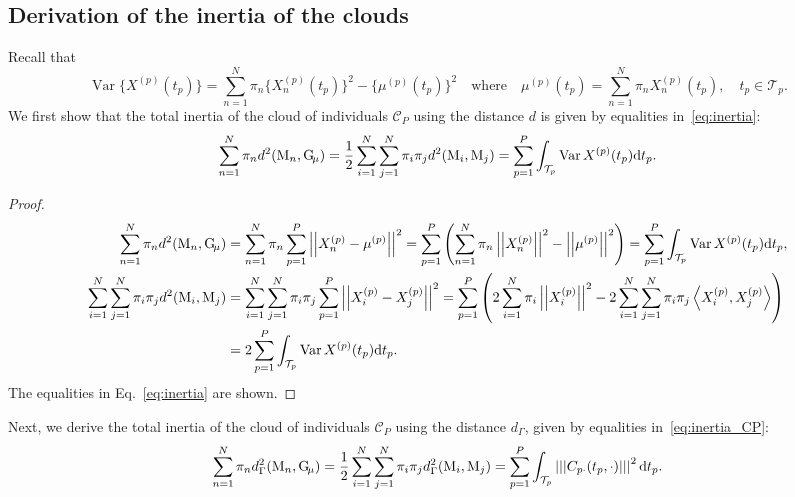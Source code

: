 \documentclass[times,sort&compress,3p]{elsarticle}
\theoremstyle{plain}%
\theoremstyle{definition}
\newcommand{\dd}{{\rm d}}
\newcommand{\TT}[1]{\mathcal{T}_{#1}} %
\newcommand{\inLp}[2]{\left\langle#1, #2\right\rangle} %
\newcommand{\normLp}[1]{\left|\left|#1\right|\right|} %
\newcommand{\normH}[1]{\left|\left|\left|#1\right|\right|\right|}
\newcommand{\Xnp}{X_n^{(p)}} %
\newcommand{\Xp}[1]{X^{(#1)}} %
\newcommand{\mup}[1]{\mu^{(#1)}} %
\newcommand{\pobs}[1]{\mathrm{#1}} %
\newcommand{\Gmu}{\pobs{G}_{\!\mu}} %
\newcommand{\CP}{\mathcal{C}_{\!P}} %
\DeclareMathOperator{\Var}{Var}
\begin{document}

\subsection{Derivation of the inertia of the clouds} %
\label{sub:derivation_of_the_inertia_of_the_clouds}

Recall that 
\begin{equation}\label{eq:var_appendix}
    \Var\{\Xp{p}(t_p)\} = \sum_{n = 1}^N \pi_n \{\Xnp(t_p)\}^2 - \{\mup{p}(t_p)\}^2 \quad\text{where}\quad \mup{p}(t_p) = \sum_{n = 1}^N \pi_n\Xnp(t_p), \quad t_p \in \TT{p}.
\end{equation}
We first show that the total inertia of the cloud of individuals $\CP$ using the distance $d$ is given by equalities in~\eqref{eq:inertia}:
$$\sum_{n = 1}^N \pi_n d^2(\pobs{M}_n, \Gmu) = \frac{1}{2}\sum_{i = 1}^N \sum_{j = 1}^N \pi_i \pi_j d^2(\pobs{M}_i, \pobs{M}_j) = \sum_{p = 1}^P \int_{\TT{p}}\Var{\Xp{p}(t_p)} \dd t_p.$$

\begin{proof}
    \begin{align*}
    \sum_{n = 1}^N \pi_n d^2(\pobs{M}_n, \Gmu) 
    &= \sum_{n = 1}^N \pi_n \sum_{p = 1}^P\normLp{\Xnp - \mu^{(p)}}^2
    = \sum_{p = 1}^P\left(\sum_{n = 1}^N \pi_n \normLp{\Xnp}^2 - \normLp{\mup{p}}^2\right) 
    = \sum_{p = 1}^P \int_{\TT{p}}\Var{\Xp{p}(t_p)} \dd t_p, \\
\sum_{i = 1}^N \sum_{j = 1}^N \pi_i \pi_j d^2(\pobs{M}_i, \pobs{M}_j) 
    &= \sum_{i = 1}^N \sum_{j = 1}^N \pi_i \pi_j \sum_{p = 1}^P \normLp{\Xp{p}_i - \Xp{p}_j}^2
    = \sum_{p = 1}^P \left(2\sum_{i = 1}^N \pi_i\normLp{\Xp{p}_i}^2 - 2\sum_{i = 1}^N \sum_{j = 1}^N \pi_i\pi_j\inLp{\Xp{p}_i}{\Xp{p}_j}\right) \\
    &= 2\sum_{p = 1}^P \int_{\TT{p}}\Var{\Xp{p}(t_p)} \dd t_p.
\end{align*}
The equalities in Eq.~\eqref{eq:inertia} are shown.
\end{proof}
Next, we derive the total inertia of the cloud of individuals $\CP$ using the distance $d_\Gamma$, given by equalities in~\eqref{eq:inertia_CP}:
$$\sum_{n = 1}^N \pi_n d_\Gamma^2(\pobs{M}_n, \Gmu) = \frac{1}{2}\sum_{i = 1}^N \sum_{j = 1}^N \pi_i \pi_j d_\Gamma^2(\pobs{M}_i, \pobs{M}_j) = \sum_{p = 1}^P \int_{\TT{p}} \normH{C_{p \cdot}(t_p, \cdot)}^2 \dd t_p. $$
\end{document}
